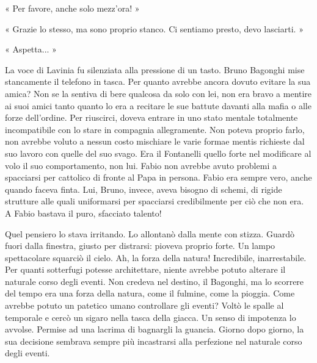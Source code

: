 « Per favore, anche solo mezz'ora! »

« Grazie lo stesso, ma sono proprio stanco. Ci sentiamo presto, devo lasciarti. »

« Aspetta... »

La voce di Lavinia fu silenziata alla pressione di un tasto. Bruno Bagonghi mise stancamente il telefono in tasca. Per quanto avrebbe ancora dovuto evitare la sua amica? Non se la sentiva di bere qualcosa da solo con lei, non era bravo a mentire ai suoi amici tanto quanto lo era a recitare le sue battute davanti alla mafia o alle forze dell'ordine. Per riuscirci, doveva entrare in uno stato mentale totalmente incompatibile con lo stare in compagnia allegramente. Non poteva proprio farlo, non avrebbe voluto a nessun costo mischiare le varie formae mentis richieste dal suo lavoro con quelle del suo svago. Era il Fontanelli quello forte nel modificare al volo il suo comportamento, non lui. Fabio non avrebbe avuto problemi a spacciarsi per cattolico di fronte al Papa in persona. Fabio era sempre vero, anche quando faceva finta. Lui, Bruno, invece, aveva bisogno di schemi, di rigide strutture alle quali uniformarsi per spacciarsi credibilmente per ciò che non era. A Fabio bastava il puro, sfacciato talento!

Quel pensiero lo stava irritando. Lo allontanò dalla mente con stizza. Guardò fuori dalla finestra, giusto per distrarsi: pioveva proprio forte. Un lampo spettacolare squarciò il cielo. Ah, la forza della natura! Incredibile, inarrestabile. Per quanti sotterfugi potesse architettare, niente avrebbe potuto alterare il naturale corso degli eventi. Non credeva nel destino, il Bagonghi, ma lo scorrere del tempo era una forza della natura, come il fulmine, come la pioggia. Come avrebbe potuto un patetico umano controllare gli eventi? Voltò le spalle al temporale e cercò un sigaro nella tasca della giacca. Un senso di impotenza lo avvolse. Permise ad una lacrima di bagnargli la guancia. Giorno dopo giorno, la sua decisione sembrava sempre più incastrarsi alla perfezione nel naturale corso degli eventi.


